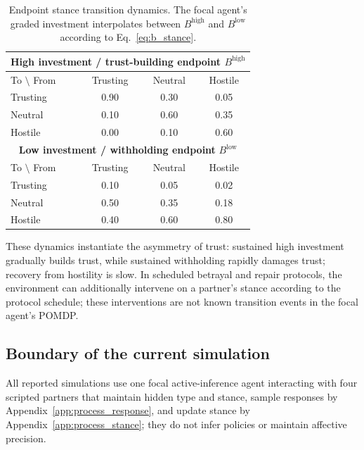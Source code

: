 \begin{table}[H]
\centering
\caption{Endpoint stance transition dynamics. The focal agent's graded investment interpolates between $B^{\mathrm{high}}$ and $B^{\mathrm{low}}$ according to Eq.~\eqref{eq:b_stance}.}
\label{tab:stance_transition}
\begin{tabular}{lccc}
\toprule
\multicolumn{4}{c}{\textbf{High investment / trust-building endpoint }$B^{\mathrm{high}}$} \\
\midrule
To $\setminus$ From & Trusting & Neutral & Hostile \\
\midrule
Trusting & 0.90 & 0.30 & 0.05 \\
Neutral & 0.10 & 0.60 & 0.35 \\
Hostile & 0.00 & 0.10 & 0.60 \\
\midrule
\multicolumn{4}{c}{\textbf{Low investment / withholding endpoint }$B^{\mathrm{low}}$} \\
\midrule
To $\setminus$ From & Trusting & Neutral & Hostile \\
\midrule
Trusting & 0.10 & 0.05 & 0.02 \\
Neutral & 0.50 & 0.35 & 0.18 \\
Hostile & 0.40 & 0.60 & 0.80 \\
\bottomrule
\end{tabular}
\end{table}

These dynamics instantiate the asymmetry of trust: sustained high investment gradually builds trust, while sustained withholding rapidly damages trust; recovery from hostility is slow. In scheduled betrayal and repair protocols, the environment can additionally intervene on a partner's stance according to the protocol schedule; these interventions are not known transition events in the focal agent's POMDP.

\subsection{Boundary of the current simulation}

All reported simulations use one focal active-inference agent interacting with four scripted partners that maintain hidden type and stance, sample responses by Appendix~\ref{app:process_response}, and update stance by Appendix~\ref{app:process_stance}; they do not infer policies or maintain affective precision.
